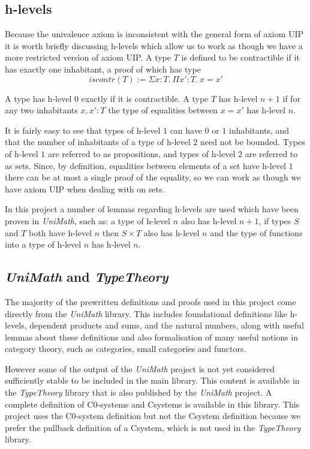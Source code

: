 \subsection{h-levels}
Because the univalence axiom is inconsistent with the general form of axiom UIP
it is worth briefly discussing h-levels which allow us to work as though we have
a more restricted version of axiom UIP. A type $T$ is defined to be contractible
if it has exactly one inhabitant, a proof of which has type
\[iscontr(T) := \Sigma x:T.\ \Pi x':T.\ x=x'\]

A type has h-level $0$ exactly if it is contractible. A type $T$ has h-level
$n+1$ if for any two inhabitants $x, x': T$ the type of equalities between
$x=x'$ has h-level $n$.

It is fairly easy to see that types of h-level $1$ can have $0$ or $1$
inhabitants, and that the number of inhabitants of a type of h-level $2$ need
not be bounded. Types of h-level $1$ are referred to as propositions, and types
of h-level $2$ are referred to as sets. Since, by definition, equalities between
elements of a set have h-level $1$ there can be at most a single proof of the
equality, so we can work as though we have axiom UIP when dealing with on sets.

In this project a number of lemmas regarding h-levels are used which have been
proven in \textit{UniMath}, such as: a type of h-level $n$ also has h-level
$n+1$, if types $S$ and $T$ both have h-level $n$ then $S\times T$ also has
h-level $n$ and the type of functions into a type of h-level $n$ has h-level
$n$.

\subsection{\textit{UniMath} and \textit{TypeTheory}}
The majority of the prewritten definitions and proofs used in this project come
directly from the \textit{UniMath} library\cite{UniMath}. This includes
foundational definitions like h-levels, dependent products and sums, and the
natural numbers, along with useful lemmas about these definitions and also
formalisation of many useful notions in category theory, such as categories,
small categories and functors.

However some of the output of the \textit{UniMath} project is not yet considered
sufficiently stable to be included in the main library. This content is
available in the \textit{TypeTheory} library\cite{TypeTheory} that is also
published by the \textit{UniMath} project. A complete definition of C0-systems
and Csystems is available in this library. This project uses the C0-system
definition but not the Csystem definition because we prefer the pullback
definition of a Csystem, which is not used in the \textit{TypeTheory} library.